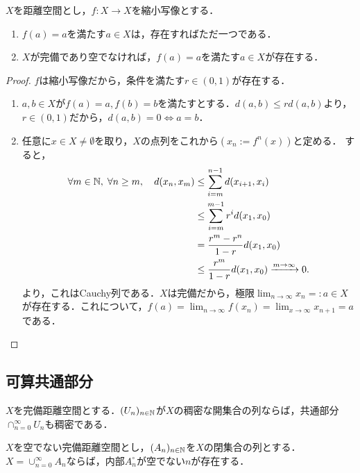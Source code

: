 \documentclass[uplatex,dvipdfmx]{jsreport}
\begin{document}
\begin{proposition}[完備距離空間の縮小写像には不動点が存在する]
    $X$を距離空間とし，$f:X\to X$を縮小写像とする．
    \begin{enumerate}
        \item $f(a)=a$を満たす$a\in X$は，存在すればただ一つである．
        \item $X$が完備であり空でなければ，$f(a)=a$を満たす$a\in X$が存在する．
    \end{enumerate}
\end{proposition}
\begin{proof}
    $f$は縮小写像だから，条件を満たす$r\in(0,1)$が存在する．
    \begin{enumerate}
        \item $a,b\in X$が$f(a)=a,f(b)=b$を満たすとする．$d(a,b)\le rd(a,b)$より，$r\in(0,1)$だから，$d(a,b)=0\Leftrightarrow a=b$．
        \item 任意に$x\in X\ne\emptyset$を取り，$X$の点列をこれから$(x_n:=f^n(x))$と定める．
        すると，
        \begin{align*}
            \forall m\in\mathbb{N},\;\forall n\ge m,\quad d(x_n,x_m)&\le \sum^{n-1}_{i=m}d(x_{i+1},x_i)\\
            &\le \sum^{m-1}_{i=m}r^id(x_1,x_0)\\
            &=\frac{r^m-r^n}{1-r}d(x_1,x_0)\\
            &\le \frac{r^m}{1-r}d(x_1,x_0)\xrightarrow{m\to\infty}0.
        \end{align*}
        より，これはCauchy列である．$X$は完備だから，極限$\lim_{n\to\infty}x_n=:a\in X$が存在する．これについて，$f(a)=\lim_{n\to\infty}f(x_n)=\lim_{x\to\infty}x_{n+1}=a$である．
    \end{enumerate}
\end{proof}

\subsection{可算共通部分}

\begin{proposition}[AC, 完備距離異空間の稠密開集合の可算共通部分は稠密]
    $X$を完備距離空間とする．$(U_n)_{n\in\mathbb{N}}$が$X$の稠密な開集合の列ならば，共通部分$\cap_{n=0}^\infty U_n$も稠密である．
\end{proposition}

\begin{corollary}[Baire, AC]
    $X$を空でない完備距離空間とし，$(A_n)_{n\in\mathbb{N}}$を$X$の閉集合の列とする．$X=\cup_{n=0}^\infty A_n$ならば，内部$A^\circ_n$が空でない$n$が存在する．
\end{corollary}
\end{document}

